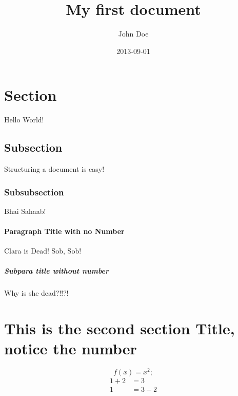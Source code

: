 \documentclass{article}
\title{My first document}
\date{2013-09-01}
\author{John Doe}
\begin{document}
  \maketitle
  \newpage
  \section{Section}
  Hello World!
  \subsection{Subsection}
  Structuring a document is easy!
  \subsubsection{Subsubsection}
  Bhai Sahaab!
  \paragraph{Paragraph Title with no Number}
  Clara is Dead! Sob, Sob!
  \subparagraph{Subpara title without number}
  Why is she dead?!!?!
  \section{This is the second section Title, notice the number}
  \begin{equation*}
  f(x) = x^2;
  \end{equation*}
  \begin{align*}
  1+2&=3\\
  1&=3-2
  \end{align*}
\end{document}
